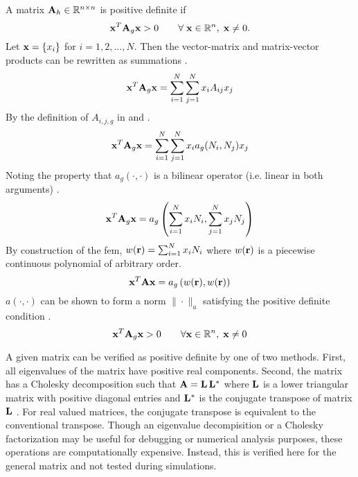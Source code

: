     A matrix $\mathbf{A}_h \in \mathbb{R}^{n \times n}$ is positive definite if
    \begin{equation} \label{eq:positive_definite}
      \mathbf{x}^{T} \mathbf{A}_g \mathbf{x} > 0 \qquad \forall \; \mathbf{x} \in \mathbb{R}^{n}, \; \mathbf{x} \ne 0.
    \end{equation}
    Let $\mathbf{x} = \{x_i\}$ for $i = 1,2,\ldots,N$. Then the vector-matrix and 
    matrix-vector products can be rewritten as summations \cite{textbookhughes}.
    \begin{equation}
      \mathbf{x}^{T} \mathbf{A}_g \mathbf{x} = \sum_{i=1}^{N} \sum_{j=1}^{N} x_i A_{ij} x_j
    \end{equation}
    By the definition of $A_{i,j,g}$ in  and 
    .
    \begin{equation}
      \mathbf{x}^{T} \mathbf{A}_g \mathbf{x} = 
        \sum_{i=1}^{N} \sum_{j=1}^{N} x_i a_g(N_i,N_j) x_j
    \end{equation}
    Noting the property that $a_g(\cdot,\cdot)$ is a bilinear operator (i.e.
    linear in both arguments) \cite{textbookli}.
    \begin{equation}
      \mathbf{x}^{T} \mathbf{A}_g \mathbf{x} =
        a_g \left( \sum_{i=1}^{N} x_i N_i, \sum_{j=1}^{N} x_j N_j 
        \right)
    \end{equation}
    By construction of the \gls{fem}, $w(\mathbf{r}) = \sum_{i=1}^{N} x_i N_i$ 
    where $w(\mathbf{r})$ is a piecewise continuous polynomial of arbitrary order.
    \begin{equation}
      \mathbf{x}^{T} \mathbf{A} \mathbf{x} = a_g \left(w(\mathbf{r}),w(\mathbf{r})\right)
    \end{equation}
    $a(\cdot,\cdot)$ can be shown to form a norm $\|\cdot \|_a$
    \cite{textbookli} satisfying the positive definite condition
    .
    \begin{equation}
      \mathbf{x}^{T} \mathbf{A}_g \mathbf{x} > 0 \qquad \forall \mathbf{x} \in \mathbb{R}^{n}, \; \mathbf{x} \ne 0
    \end{equation}
    
    A given matrix can be verified as positive definite by one of two methods.
    First, all eigenvalues of the matrix have positive real components. Second,
    the matrix has a Cholesky decomposition such that $\mathbf{A} = \mathbf{L} \, \mathbf{L}^*$ where
    $\mathbf{L}$ is a lower triangular matrix with positive diagonal entries and
    $\mathbf{L}^*$ is the conjugate transpose of matrix $\mathbf{L}$ \cite{textbookipsen}. For
    real valued matrices, the conjugate transpose is equivalent to the
    conventional transpose. Though an eigenvalue decompisition or a Cholesky
    factorization may be useful for debugging or numerical analysis purposes, 
    these operations are computationally expensive. Instead, this is verified 
    here for the general matrix and not tested during simulations.
    
